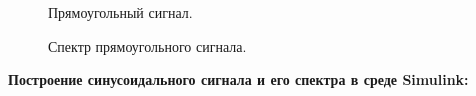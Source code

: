 \documentclass[12pt,a4paper]{scrartcl}
\begin{document}
\begin{figure}[h!]
	\caption{Прямоугольный сигнал.}
\end{figure}
\begin{figure}[h!]
	\caption{Спектр прямоугольного сигнала.}
\end{figure}
\newpage
\textbf{Построение синусоидального сигнала и его спектра в среде Simulink:\\\\}
\end{document}
